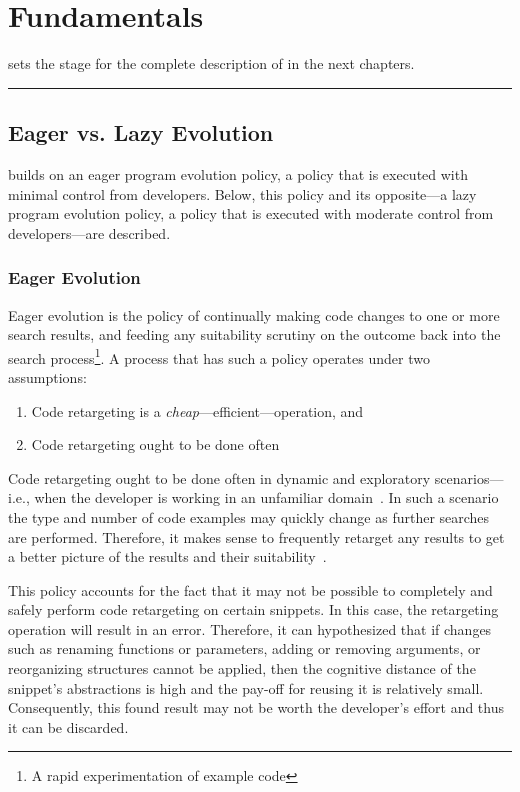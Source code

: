 \chapter{Fundamentals}{}
\label{sec:fundamentals}


 sets the stage for the complete description of \Tool in the next chapters.

\fancybreak{\pfbreakdisplay}

\section{Eager vs. Lazy Evolution}
\label{sec:eagervslazy}

\uppercase{\Tool} builds on an eager program evolution policy, a policy that is executed with minimal control from developers. Below, this policy and its opposite---a lazy program evolution policy, a policy that is executed with moderate control from developers---are described.

\subsection{Eager Evolution}

Eager evolution is the policy of continually making code changes to one or more search results, and feeding any suitability scrutiny on the outcome back into the search process\footnote{A rapid experimentation of example code}. A process that has such a policy operates under two assumptions:

\begin{enumerate}
	\item Code retargeting is a \emph{cheap}---efficient---operation, and
	\item Code retargeting ought to be done often
\end{enumerate}

Code retargeting ought to be done often in dynamic and exploratory scenarios---i.e., when the developer is working in an unfamiliar domain~\cite{Brandt:2009ew}. In such a scenario the type and number of code examples may quickly change as further searches are performed. Therefore, it makes sense to frequently retarget any results to get a better picture of the results and their suitability~\cite{Fowler:1999vp, Brandt:2009ew}. 

This policy accounts for the fact that it may not be possible to completely and safely perform code retargeting on certain snippets. In this case, the retargeting operation will result in an error. Therefore, it can hypothesized that if changes such as renaming functions or parameters, adding or removing arguments, or reorganizing structures cannot be applied, then the cognitive distance of the snippet's abstractions is high and the pay-off for reusing it is relatively small. Consequently, this found result may not be worth the developer's effort and thus it can be discarded.    


